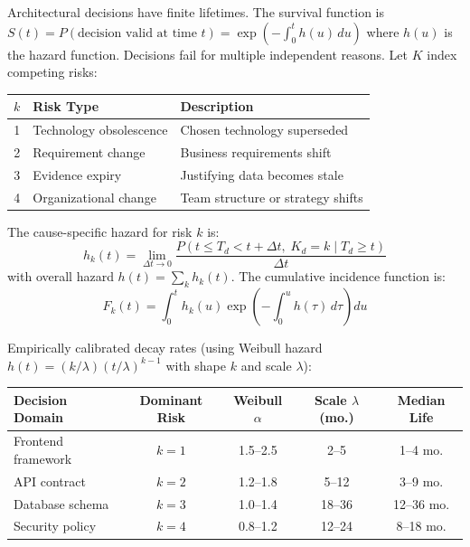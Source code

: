 \documentclass[11pt, a4paper, logo, copyright]{googledeepmind}
\begin{document}
Architectural decisions have finite lifetimes. The survival function is $S(t) = P(\text{decision valid at time } t) = \exp\left(-\int_0^t h(u) \, du\right)$ where $h(u)$ is the hazard function. Decisions fail for multiple independent reasons. Let $K$ index competing risks:

\begin{center}
\begin{tabular}{clp{7cm}}
\toprule
$k$ & Risk Type & Description \\
\midrule
1 & Technology obsolescence & Chosen technology superseded \\
2 & Requirement change & Business requirements shift \\
3 & Evidence expiry & Justifying data becomes stale \\
4 & Organizational change & Team structure or strategy shifts \\
\bottomrule
\end{tabular}
\end{center}

The cause-specific hazard for risk $k$ is:
\begin{equation}
    h_k(t) = \lim_{\Delta t \to 0} \frac{P(t \leq T_d < t + \Delta t, \; K_d = k \mid T_d \geq t)}{\Delta t}
\end{equation}
with overall hazard $h(t) = \sum_k h_k(t)$. The cumulative incidence function is:
\begin{equation}
    F_k(t) = \int_0^t h_k(u) \exp\!\left(-\int_0^u h(\tau)\, d\tau\right) du
\end{equation}

Empirically calibrated decay rates (using Weibull hazard $h(t) = (k/\lambda)(t/\lambda)^{k-1}$ with shape $k$ and scale $\lambda$):

\begin{center}
\begin{tabular}{lcccc}
\toprule
Decision Domain & Dominant Risk & Weibull $\alpha$ & Scale $\lambda$ (mo.) & Median Life \\
\midrule
Frontend framework & $k=1$ & 1.5--2.5 & 2--5 & 1--4 mo. \\
API contract & $k=2$ & 1.2--1.8 & 5--12 & 3--9 mo. \\
Database schema & $k=3$ & 1.0--1.4 & 18--36 & 12--36 mo. \\
Security policy & $k=4$ & 0.8--1.2 & 12--24 & 8--18 mo. \\
\bottomrule
\end{tabular}
\end{center}
\end{document}
